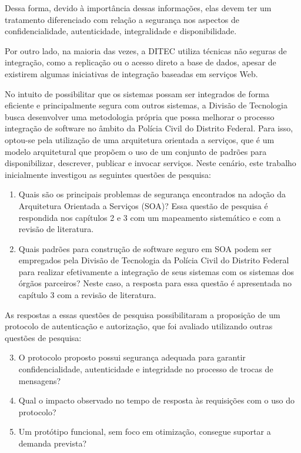 Dessa forma, devido à importância dessas informações, elas devem ter um tratamento diferenciado com relação a segurança nos aspectos de confidencialidade, autenticidade, integralidade e disponibilidade.

Por outro lado, na maioria das vezes, a DITEC utiliza técnicas não seguras de integração, como a replicação ou o acesso direto a base de dados, apesar de existirem algumas iniciativas de integração baseadas em serviços Web.

No intuito de possibilitar que os sistemas possam ser integrados de forma eficiente e principalmente segura com outros sistemas, a Divisão de Tecnologia busca desenvolver uma metodologia própria que possa melhorar o processo integração de software no âmbito da Polícia Civil do Distrito Federal.
Para isso, optou-se pela utilização de uma arquitetura orientada a serviços, que é um modelo arquitetural que propõem o uso de um conjunto de padrões para disponibilizar, descrever, publicar e invocar serviços. Neste cenário, este trabalho inicialmente investigou as seguintes questões de pesquisa:

\begin{enumerate}
	\item Quais são os principais problemas de segurança encontrados na adoção da Arquitetura Orientada a Serviços \-(SOA)? Essa questão de pesquisa é respondida nos capítulos 2 e 3 com um mapeamento sistemático e com a revisão de literatura.
	\item Quais padrões para construção de software seguro em SOA podem ser empregados pela Divisão de Tecnologia da Polícia Civil do Distrito Federal para realizar efetivamente a integração de seus sistemas com os sistemas dos órgãos parceiros? Neste caso, a resposta para essa questão é apresentada no capítulo 3 com a revisão de literatura.
\end{enumerate}

As respostas a essas questões de pesquisa possibilitaram a proposição de um protocolo de autenticação e autorização, que foi avaliado utilizando outras questões de pesquisa:

\begin{enumerate}
\setcounter{enumi}{2}
  \item O protocolo proposto possui segurança adequada para garantir confidencialidade, autenticidade e integridade no processo de trocas de mensagens?
  \item Qual o impacto observado no tempo de resposta às requisições com o uso do protocolo?
  \item Um protótipo funcional, sem foco em otimização, consegue suportar a demanda prevista?

\end{enumerate}

